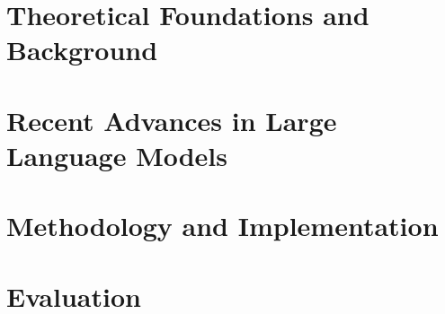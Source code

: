 \documentclass[a4paper,twoside]{book}
\begin{document}
     


\chapter{Theoretical Foundations and Background}


\chapter{Recent Advances in Large Language Models}


\chapter{Methodology and Implementation}


\chapter{Evaluation}



\end{document}

